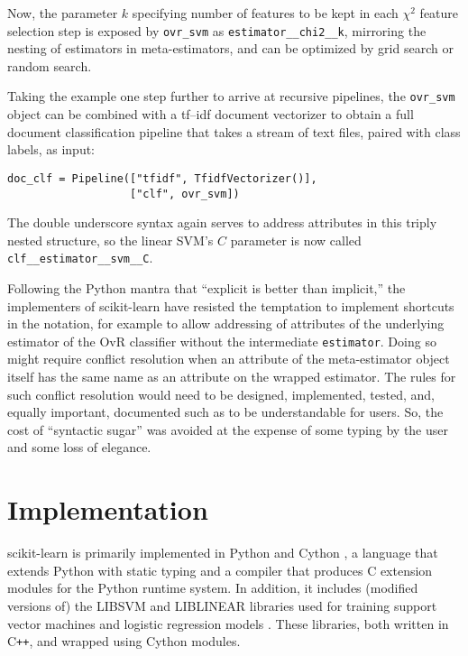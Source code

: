 \documentclass[a4paper,twocolumn]{article}
\begin{document}
Now, the parameter $k$ specifying number of features to be kept
in each $\chi^2$ feature selection step
is exposed by \texttt{ovr\_svm} as \texttt{estimator\_\_chi2\_\_k},
mirroring the nesting of estimators in meta-estimators,
and can be optimized by grid search or random search.

Taking the example one step further to arrive at recursive pipelines,
the \texttt{ovr\_svm} object can be combined
with a \textsf{tf--idf} document vectorizer
to obtain a full document classification pipeline
that takes a stream of text files, paired with class labels, as input:

\begin{verbatim}
doc_clf = Pipeline(["tfidf", TfidfVectorizer()],
                   ["clf", ovr_svm])
\end{verbatim}

The double underscore syntax again serves to address attributes
in this triply nested structure,
so the linear SVM's $C$ parameter
is now called \texttt{clf\_\_estimator\_\_svm\_\_C}.

Following the Python mantra that ``explicit is better than implicit,''
the implementers of scikit-learn have resisted the temptation
to implement shortcuts in the notation,
for example to allow addressing of attributes
of the underlying estimator of the OvR classifier
without the intermediate \texttt{estimator}.
Doing so might require conflict resolution
when an attribute of the meta-estimator object itself
has the same name as an attribute on the wrapped estimator.
The rules for such conflict resolution would need to be
designed, implemented, tested, and, equally important, documented
such as to be understandable for users.
So, the cost of ``syntactic sugar'' was avoided
at the expense of some typing by the user and some loss of elegance.

\section{Implementation}

scikit-learn is primarily implemented in Python and Cython
\citep{behnel2011cython},
a language that extends Python with static typing
and a compiler that produces C extension modules
for the Python runtime system.
In addition, it includes (modified versions of)
the \textsf{LIBSVM} and \textsf{LIBLINEAR} libraries
used for training support vector machines
and logistic regression models \citep{chang2011libsvm, fan2008}.
These libraries, both written in C{}\verb!++!,
and wrapped using Cython modules.
\end{document}
